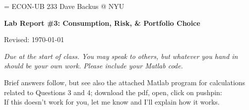 \documentclass[11pt]{exam}
\begin{document}
\parskip=\bigskipamount
\parindent=0.0in
\thispagestyle{empty}
{\large ECON-UB 233 \hfill Dave Backus @ NYU}

\bigskip\bigskip
\centerline{\Large \bf Lab Report \#3: Consumption, Risk, \& Portfolio Choice}
\centerline{Revised: \today}

\bigskip
{\it Due at the start of class.
You may speak to others, but whatever you hand in should be your own work.
Please include your Matlab code.}

\begin{solution}
Brief answers follow,
but see also the attached Matlab program for calculations
related to Questions 3 and 4;
download the pdf, open, click on pushpin:
 \\
If this doesn't work for you, let me know and I'll explain how it works.
\end{solution}
\end{document}
